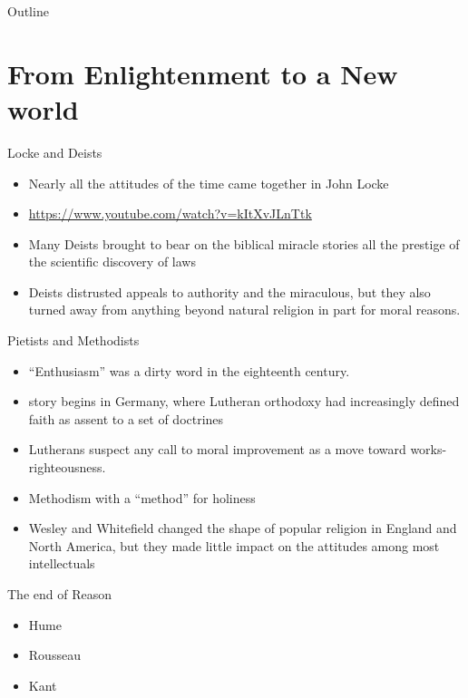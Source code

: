 

\maketitle
\begin{frame}{Outline}
\setcounter{tocdepth}{1}
\tableofcontents
\end{frame}


\section{From Enlightenment to a New world}
\label{sec-1}
\begin{frame}[label=sec-1-1]{Locke and Deists}
\begin{itemize}
\item Nearly all the attitudes of the time came together in John Locke
\item \url{https://www.youtube.com/watch?v=kItXvJLnTtk}
\item Many Deists brought to bear on the biblical miracle stories all the prestige of the scientific discovery of laws
\item Deists distrusted appeals to authority and the miraculous, but they also turned away from anything beyond natural religion in part for moral reasons.
\end{itemize}
\end{frame}
\begin{frame}[label=sec-1-2]{Pietists and Methodists}
\begin{itemize}
\item ``\alert{Enthusiasm}'' was a dirty word in the eighteenth century.
\item story begins in Germany, where Lutheran orthodoxy had increasingly defined faith as assent to a set of doctrines
\item Lutherans suspect any call to moral improvement as a move toward works-righteousness.
\item Methodism with a ``method'' for holiness
\item Wesley and Whitefield changed the shape of popular religion in England and North America, but they made little impact on the attitudes among most intellectuals
\end{itemize}
\end{frame}
\begin{frame}[label=sec-1-3]{The end of Reason}
\begin{itemize}
\item Hume
\item Rousseau
\item Kant
\end{itemize}
\end{frame}
